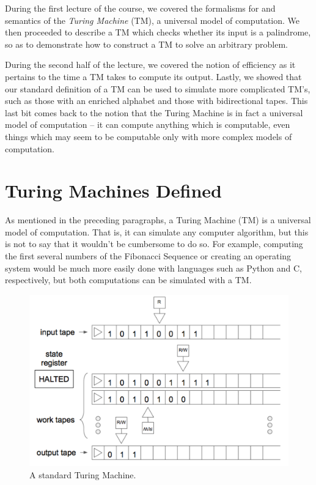 \documentclass[usletter]{article}
\begin{document}

\noindent
During the first lecture of the course, we covered the formalisms for and semantics of the \emph{Turing Machine} (TM), a universal model of computation. We then proceeded to describe a TM which checks whether its input is a palindrome, so as to demonstrate how to construct a TM to solve an arbitrary problem.

During the second half of the lecture, we covered the notion of efficiency as it pertains to the time a TM takes to compute its output. Lastly, we showed that our standard definition of a TM can be used to simulate more complicated TM's, such as those with an enriched alphabet and those with bidirectional tapes. This last bit comes back to the notion that the Turing Machine is in fact a universal model of computation -- it can compute anything which is computable, even things which may seem to be computable only with more complex models of computation.

\section{Turing Machines Defined}
\label{sec:tmdef}

As mentioned in the preceding paragraphs, a Turing Machine (TM) is a universal model of computation. That is, it can simulate any computer algorithm, but this is not to say that it wouldn't be cumbersome to do so. For example, computing the first several numbers of the Fibonacci Sequence or creating an operating system would be much more easily done with languages such as Python and C, respectively, but both computations can be simulated with a TM. 

\begin{figure}[h!]
\begin{center}
\includegraphics[width=\textwidth]{tm}
\end{center}
\caption{A standard Turing Machine.}
\label{fig:tm}
\end{figure}
\end{document}

